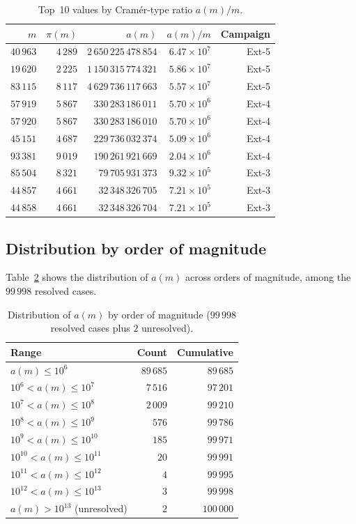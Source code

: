 \documentclass{amsart}
\theoremstyle{definition}
\theoremstyle{remark}
\numberwithin{equation}{section}
\begin{document}
\begin{table}[ht]
\centering
\caption{Top~10 values by Cram\'er-type ratio $a(m)/m$.}
\label{tab:top10_ratio}
\small
\begin{tabular}{rrrrr}
\toprule
$m$ & $\pi(m)$ & $a(m)$ & $a(m)/m$ & Campaign \\
\midrule
$40\,963$ & $4\,289$ & $2\,650\,225\,478\,854$ & $6.47 \times 10^7$ & Ext-5 \\
$19\,620$ & $2\,225$ & $1\,150\,315\,774\,321$ & $5.86 \times 10^7$ & Ext-5 \\
$83\,115$ & $8\,117$ & $4\,629\,736\,117\,663$ & $5.57 \times 10^7$ & Ext-5 \\
$57\,919$ & $5\,867$ & $330\,283\,186\,011$ & $5.70 \times 10^6$ & Ext-4 \\
$57\,920$ & $5\,867$ & $330\,283\,186\,010$ & $5.70 \times 10^6$ & Ext-4 \\
$45\,151$ & $4\,687$ & $229\,736\,032\,374$ & $5.09 \times 10^6$ & Ext-4 \\
$93\,381$ & $9\,019$ & $190\,261\,921\,669$ & $2.04 \times 10^6$ & Ext-4 \\
$85\,504$ & $8\,321$ & $79\,705\,931\,373$ & $9.32 \times 10^5$ & Ext-3 \\
$44\,857$ & $4\,661$ & $32\,348\,326\,705$ & $7.21 \times 10^5$ & Ext-3 \\
$44\,858$ & $4\,661$ & $32\,348\,326\,704$ & $7.21 \times 10^5$ & Ext-3 \\
\bottomrule
\end{tabular}
\end{table}

\subsection{Distribution by order of magnitude}

Table~\ref{tab:distribution} shows the distribution of $a(m)$
across orders of magnitude, among the $99\,998$ resolved cases.

\begin{table}[ht]
\centering
\caption{Distribution of $a(m)$ by order of magnitude
($99\,998$ resolved cases plus $2$ unresolved).}
\label{tab:distribution}
\begin{tabular}{lrr}
\toprule
Range & Count & Cumulative \\
\midrule
$a(m) \le 10^6$     & $89\,685$ & $89\,685$ \\
$10^6 < a(m) \le 10^7$   & $7\,516$ & $97\,201$ \\
$10^7 < a(m) \le 10^8$   & $2\,009$ & $99\,210$ \\
$10^8 < a(m) \le 10^9$   & $576$ & $99\,786$ \\
$10^9 < a(m) \le 10^{10}$  & $185$ & $99\,971$ \\
$10^{10} < a(m) \le 10^{11}$ & $20$ & $99\,991$ \\
$10^{11} < a(m) \le 10^{12}$ & $4$ & $99\,995$ \\
$10^{12} < a(m) \le 10^{13}$ & $3$ & $99\,998$ \\
$a(m) > 10^{13}$ (unresolved) & $2$ & $100\,000$ \\
\bottomrule
\end{tabular}
\end{table}
\end{document}

